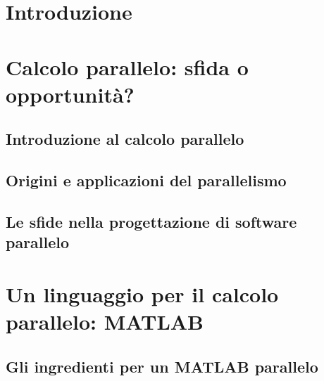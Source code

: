 \documentclass[
	a4paper,
	twoside,
	12pt
]{book}
\begin{document}
\frontmatter

\tableofcontents
\mainmatter
\chapter*{Introduzione}
\label{cap:introduzione}

\chapter{Calcolo parallelo: sfida o opportunit\`a?}
\label{cap:calcoloParalleloSfidaOpportunita}

\section{Introduzione al calcolo parallelo}
\label{par:introduzioneCalcoloParallelo}
\nocite{Patterson2022}
\nocite{Silberschatz2014}

\section{Origini e applicazioni del parallelismo}
\label{par:causeParallelismo}
\nocite{Hennessy2019}

\section{Le sfide nella progettazione di software parallelo}
\label{par:sfideSoftwareParallelo}

\chapter{Un linguaggio per il calcolo parallelo: MATLAB}
\label{cap:unLinguaggioPerIlCalcoloParalleloMATLAB}

\section{Gli ingredienti per un MATLAB parallelo}
\nocite{Sharma2009}
\label{par:ingredientiMATLABParallelo}

\end{document}
